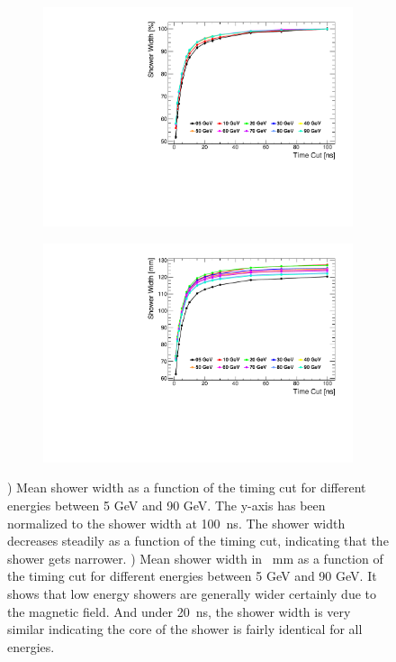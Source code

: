 \begin{figure}[htbp!]
  \centering
  \begin{subfigure}[t]{0.49\textwidth}
    \centering
    \includegraphics[width=1\linewidth]{../Thesis_Plots/ILD/NoSmearing/Plots/ShowerWidth_TimeCuts_noSmearing}
    \caption{} \label{fig:ShowerWidthNoSmearing}
  \end{subfigure}
  \hfill
  \begin{subfigure}[t]{0.49\textwidth}
    \centering
    \includegraphics[width=1\linewidth]{../Thesis_Plots/ILD/NoSmearing/Plots/ShowerWidthAbso_TimeCuts_noSmearing}
    \caption{} \label{fig:ShowerWidthAbsoNoSmearing}
  \end{subfigure}
  \caption{) Mean shower width as a function of the timing cut for different \kzeroL{} energies between 5 GeV and 90 GeV. The y-axis has been normalized to the shower width at \SI{100}{\nano\second}. The shower width decreases steadily as a function of the timing cut, indicating that the shower gets narrower. ) Mean shower width in \SI{}{\milli\meter} as a function of the timing cut for different \kzeroL{} energies between 5 GeV and 90 GeV. It shows that low energy showers are generally wider certainly due to the magnetic field. And under \SI{20}{\nano\second}, the shower width is very similar indicating the core of the shower is fairly identical for all energies.}
\end{figure}

